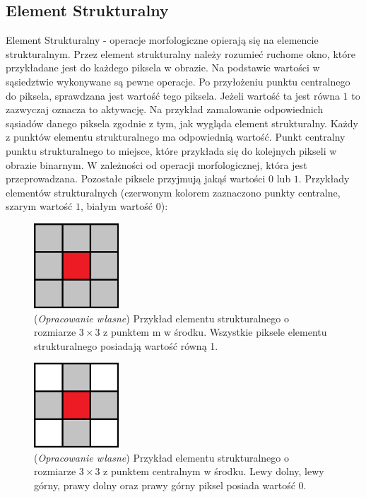\documentclass{article}
\begin{document}
        \subsection{Element Strukturalny}
        {
            \Large
            \justifying
            \quad
            Element Strukturalny - operacje morfologiczne opierają się na elemencie strukturalnym.
            Przez element strukturalny należy rozumieć ruchome okno, które przykładane jest do każdego piksela w obrazie.
            Na podstawie wartości w sąsiedztwie wykonywane są pewne operacje.
            Po przyłożeniu punktu centralnego do piksela, sprawdzana jest wartość tego piksela.
            Jeżeli wartość ta jest równa \(1\) to zazwyczaj oznacza to aktywację.
            Na przykład zamalowanie odpowiednich sąsiadów danego piksela zgodnie z tym, jak wygląda element strukturalny.
            Każdy z punktów elementu strukturalnego ma odpowiednią wartość.
            Punkt centralny punktu strukturalnego to miejsce, które przykłada się do kolejnych pikseli w obrazie binarnym.
            W zależności od operacji morfologicznej, która jest przeprowadzana.
            Pozostałe piksele przyjmują jakąś wartości \(0\) lub \(1\).
            Przykłady elementów strukturalnych (czerwonym kolorem zaznaczono punkty centralne, szarym wartość \(1\), białym wartość \(0\)):
        }
        \begin{figure}[H]
            \captionsetup{margin=1.5cm}
            \centering
            \includegraphics[width=120px]{element_strukturalny_1.png}
            \caption
            {
                (\textit{Opracowanie własne}) Przykład elementu strukturalnego o rozmiarze \(3 \times 3\) z punktem m w środku.
                Wszystkie piksele elementu strukturalnego posiadają wartość równą 1.
            }
        \end{figure}
        \begin{figure}[H]
            \captionsetup{margin=1.5cm}
            \centering
            \includegraphics[width=120px]{element_strukturalny_2.png}
            \caption
            {
                (\textit{Opracowanie własne}) Przykład elementu strukturalnego o rozmiarze \(3 \times 3\) z punktem centralnym w środku.
                Lewy dolny, lewy górny, prawy dolny oraz prawy górny piksel posiada wartość 0.
            }
        \end{figure}
\end{document}
